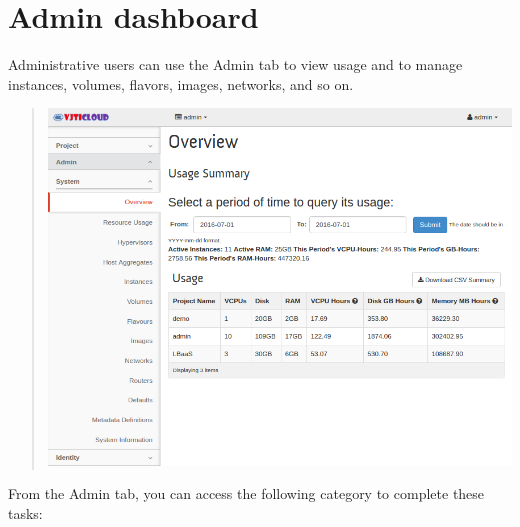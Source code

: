 \documentclass[letterpaper,10pt,english]{sphinxmanual}
\begin{document}
\section{Admin dashboard}
\label{_source/admin_guide/admin_tab::doc}\label{_source/admin_guide/admin_tab:admin-dashboard}
Administrative users can use the Admin tab to view usage and to manage instances, volumes, flavors, images, networks, and so on.
\begin{quote}

\includegraphics{sys_usage_overview.png}
\end{quote}

From the Admin tab, you can access the following category to complete these tasks:
\end{document}
